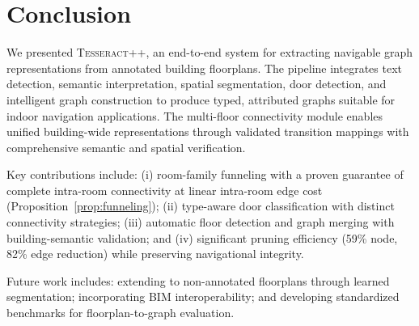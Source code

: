 \documentclass[manuscript,screen,review]{acmart}
\newcommand{\tesseract}{\textsc{Tesseract++}}
\begin{document}
\section{Conclusion}
\label{sec:conclusion}

We presented \tesseract{}, an end-to-end system for extracting navigable graph representations from annotated building floorplans. The pipeline integrates text detection, semantic interpretation, spatial segmentation, door detection, and intelligent graph construction to produce typed, attributed graphs suitable for indoor navigation applications. The multi-floor connectivity module enables unified building-wide representations through validated transition mappings with comprehensive semantic and spatial verification.

Key contributions include: (i) room-family funneling with a proven guarantee of complete intra-room connectivity at linear intra-room edge cost (Proposition~\ref{prop:funneling}); (ii) type-aware door classification with distinct connectivity strategies; (iii) automatic floor detection and graph merging with building-semantic validation; and (iv) significant pruning efficiency (59\% node, 82\% edge reduction) while preserving navigational integrity.

Future work includes: extending to non-annotated floorplans through learned segmentation; incorporating BIM interoperability; and developing standardized benchmarks for floorplan-to-graph evaluation.

\begin{acks}
\end{acks}




\appendix
\end{document}
